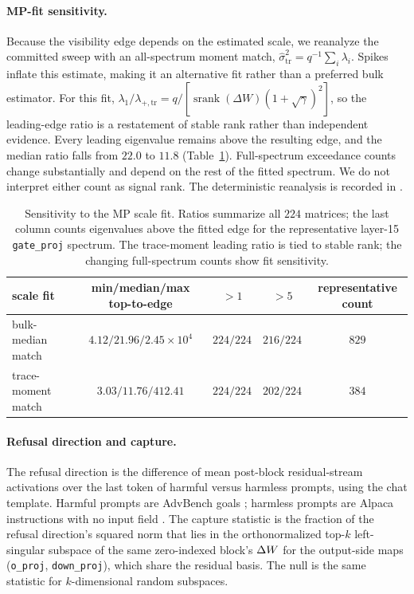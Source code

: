 \paragraph{MP-fit sensitivity.}
Because the visibility edge depends on the estimated scale, we reanalyze the
committed sweep with an all-spectrum moment match,
$\hat\sigma^2_{\mathrm{tr}}=q^{-1}\sum_i\lambda_i$. Spikes inflate this
estimate, making it an alternative fit rather than a preferred bulk estimator.
For this fit,
$\lambda_1/\lambda_{+,\mathrm{tr}}=
q/[\operatorname{srank}(\Delta W)(1+\sqrt\gamma)^2]$, so the leading-edge
ratio is a restatement of stable rank rather than independent evidence. Every
leading eigenvalue remains above the resulting edge, and the median ratio falls
from $22.0$ to $11.8$ (Table~\ref{tab:mp-sensitivity}). Full-spectrum
exceedance counts change substantially and depend on the rest of the fitted
spectrum. We do not interpret either count as signal rank. The deterministic
reanalysis is recorded in .

\begin{table}[!htbp]
\centering
\caption{Sensitivity to the MP scale fit. Ratios summarize all $224$ matrices;
the last column counts eigenvalues above the fitted edge for the representative
layer-15 \texttt{gate\_proj} spectrum. The trace-moment leading ratio is tied to
stable rank; the changing full-spectrum counts show fit sensitivity.}
\label{tab:mp-sensitivity}
\small
\begin{tabular}{lcccc}
\toprule
scale fit & min/median/max top-to-edge & $>1$ & $>5$ & representative count \\
\midrule
bulk-median match & $4.12/21.96/2.45{\times}10^4$ & $224/224$ & $216/224$ & $829$ \\
trace-moment match & $3.03/11.76/412.41$ & $224/224$ & $202/224$ & $384$ \\
\bottomrule
\end{tabular}
\end{table}

\paragraph{Refusal direction and capture.}
The refusal direction is the difference of mean post-block residual-stream
activations over the last token of harmful versus harmless prompts, using
the chat template. Harmful prompts are AdvBench goals \citep{zou2023universal};
harmless prompts are Alpaca instructions with no input field
\citep{taori2023alpaca}. The capture statistic is the fraction
of the refusal direction's squared norm that lies in the orthonormalized top-$k$
left-singular subspace of the same zero-indexed block's $\Delta W$ for the output-side maps (\texttt{o\_proj},
\texttt{down\_proj}), which share the residual basis. The null is the same
statistic for $k$-dimensional random subspaces.

